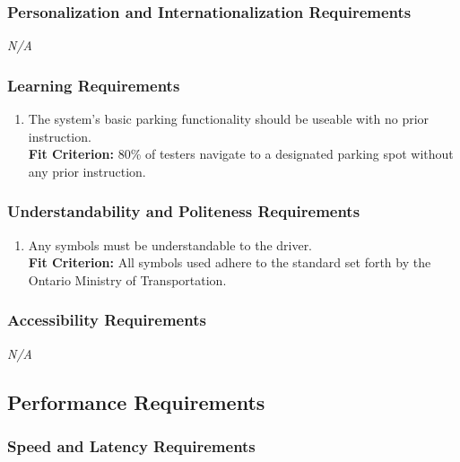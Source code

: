 \documentclass[12pt,letterpaper]{article}
\begin{document}
\subsubsection{Personalization and Internationalization Requirements}
\noindent \emph{N/A}

\subsubsection{Learning Requirements}
\begin{enumerate}[resume*] 
    \item The system's basic parking functionality should be useable with no
    prior instruction. \label{pocnf2}\\
    \textbf{Fit Criterion:} 80\% of testers navigate to a designated parking
    spot without any prior instruction. 
\end{enumerate}

\subsubsection{Understandability and Politeness Requirements}
\begin{enumerate}[resume*] 
    \item Any symbols must be understandable to the driver. \label{pocnf3} \\
    \textbf{Fit Criterion:} All symbols used adhere to the standard set forth by
    the Ontario Ministry of Transportation.
\end{enumerate}

\subsubsection{Accessibility Requirements}
\noindent \emph{N/A}

\subsection{Performance Requirements}
\subsubsection{Speed and Latency Requirements}
\begin{enumerate}[{PE}1.] 
\end{enumerate}
\end{document}
